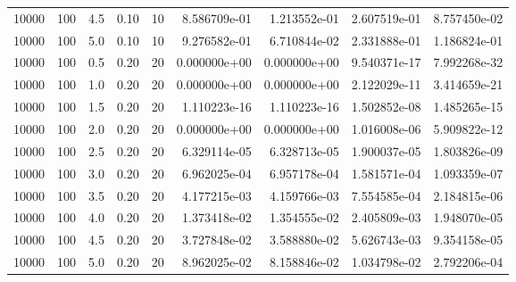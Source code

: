 \begin{tabular}{rrrrrrrrr}
 10000 &  100 &  4.5 &  0.10 &    10 &  8.586709e-01 &  1.213552e-01 &  2.607519e-01 &  8.757450e-02 \\
 10000 &  100 &  5.0 &  0.10 &    10 &  9.276582e-01 &  6.710844e-02 &  2.331888e-01 &  1.186824e-01 \\
 10000 &  100 &  0.5 &  0.20 &    20 &  0.000000e+00 &  0.000000e+00 &  9.540371e-17 &  7.992268e-32 \\
 10000 &  100 &  1.0 &  0.20 &    20 &  0.000000e+00 &  0.000000e+00 &  2.122029e-11 &  3.414659e-21 \\
 10000 &  100 &  1.5 &  0.20 &    20 &  1.110223e-16 &  1.110223e-16 &  1.502852e-08 &  1.485265e-15 \\
 10000 &  100 &  2.0 &  0.20 &    20 &  0.000000e+00 &  0.000000e+00 &  1.016008e-06 &  5.909822e-12 \\
 10000 &  100 &  2.5 &  0.20 &    20 &  6.329114e-05 &  6.328713e-05 &  1.900037e-05 &  1.803826e-09 \\
 10000 &  100 &  3.0 &  0.20 &    20 &  6.962025e-04 &  6.957178e-04 &  1.581571e-04 &  1.093359e-07 \\
 10000 &  100 &  3.5 &  0.20 &    20 &  4.177215e-03 &  4.159766e-03 &  7.554585e-04 &  2.184815e-06 \\
 10000 &  100 &  4.0 &  0.20 &    20 &  1.373418e-02 &  1.354555e-02 &  2.405809e-03 &  1.948070e-05 \\
 10000 &  100 &  4.5 &  0.20 &    20 &  3.727848e-02 &  3.588880e-02 &  5.626743e-03 &  9.354158e-05 \\
 10000 &  100 &  5.0 &  0.20 &    20 &  8.962025e-02 &  8.158846e-02 &  1.034798e-02 &  2.792206e-04 \\
\bottomrule
\end{tabular}
